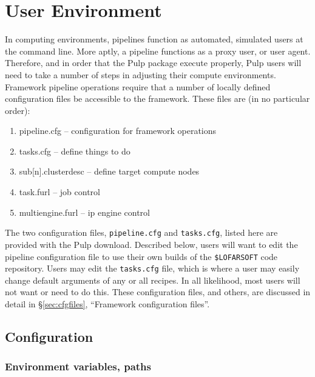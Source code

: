 \documentclass[a4paper,10pt,bibtotoc]{scrartcl}
\begin{document}
\section{User Environment}
\label{sec:environment}
In computing environments, pipelines function as automated, simulated
users at the command line.  More aptly, a pipeline
functions as a proxy user, or user agent. Therefore, and in order
that the Pulp package execute properly, Pulp users will need to take a
number of steps in adjusting their compute environments. Framework
pipeline operations require that a number of locally defined
configuration files be accessible to the framework. These files are
(in no particular order):
\begin{enumerate}
\item pipeline.cfg            -- configuration for framework operations
\item tasks.cfg                -- define things to do
\item sub[n].clusterdesc -- define target compute nodes
\item task.furl                 -- job control
\item multiengine.furl     -- ip engine control
\end{enumerate}
The two configuration files, \verb|pipeline.cfg| and \verb|tasks.cfg|,
listed here are provided with the Pulp download.  Described below,
users will want to edit the pipeline configuration file to use their
own builds of the \verb|$LOFARSOFT| code repository.  Users may edit the
\verb|tasks.cfg| file, which is where a user may easily change default
arguments of any or all recipes.  In all likelihood, most users will
not want or need to do this. These configuration files, and others,
are discussed in detail in \S\ref{sec:cfgfiles}, ``Framework configuration files''.

\subsection{Configuration}
\label{sec:config}
\subsubsection{Environment variables, paths}
\end{document}
